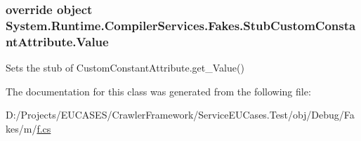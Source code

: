 \hypertarget{class_system_1_1_runtime_1_1_compiler_services_1_1_fakes_1_1_stub_custom_constant_attribute_a53ae1b82279d082dd4fb3c8378184684}{
\subsubsection[{Value}]{\setlength{\rightskip}{0pt plus 5cm}override object System.\-Runtime.\-Compiler\-Services.\-Fakes.\-Stub\-Custom\-Constant\-Attribute.\-Value\hspace{0.3cm}{\ttfamily [get]}}}\label{class_system_1_1_runtime_1_1_compiler_services_1_1_fakes_1_1_stub_custom_constant_attribute_a53ae1b82279d082dd4fb3c8378184684}


Sets the stub of Custom\-Constant\-Attribute.\-get\-\_\-\-Value()



The documentation for this class was generated from the following file\-:\begin{DoxyCompactItemize}
\item 
D\-:/\-Projects/\-E\-U\-C\-A\-S\-E\-S/\-Crawler\-Framework/\-Service\-E\-U\-Cases.\-Test/obj/\-Debug/\-Fakes/m/\hyperlink{m_2f_8cs}{f.\-cs}\end{DoxyCompactItemize}
